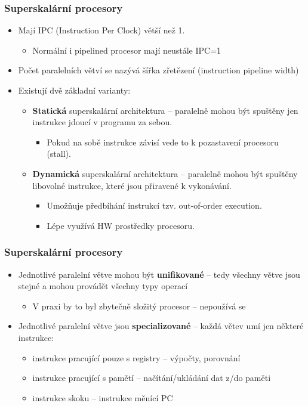 \documentclass{beamer}
\begin{document}
\begin{frame}
\frametitle{Superskalární procesory}

\begin{itemize}
\item Mají IPC (Instruction Per Clock) větší než 1. 
  \begin{itemize}
  \item Normální i pipelined procesor mají neustále IPC=1
  \end{itemize}
\item Počet paralelních větví se nazývá šířka zřetězení (instruction pipeline width)
\item Existují dvě základní varianty:
  \begin{itemize}
  \item \textbf{Statická} superskalární architektura -- paralelně mohou být spuštěny jen instrukce jdoucí v programu za sebou.
    \begin{itemize}
    \item Pokud na sobě instrukce závisí vede to k pozastavení procesoru (stall).
    \end{itemize}
  \item \textbf{Dynamická} superskalární architektura -- paralelně mohou být spuštěny libovolné instrukce, které jsou přiravené k vykonávání. 
    \begin{itemize}
    \item Umožňuje předbíhání instrukcí tzv. out-of-order execution.
    \item Lépe využívá HW prostředky procesoru.
    \end{itemize}
  \end{itemize}
\end{itemize}

\end{frame}

\begin{frame}
\frametitle{Superskalární procesory}

\begin{itemize}
\item Jednotlivé paralelní větve mohou být \textbf{unifikované} -- tedy všechny větve jsou stejné a mohou provádět všechny typy operací
  \begin{itemize}
  \item V praxi by to byl zbytečně složitý procesor -- nepoužívá se
  \end{itemize}
\item Jednotlivé paralelní větve jsou \textbf{specializované} -- každá větev umí jen některé instrukce:
  \begin{itemize}
  \item instrukce pracující pouze s registry -- výpočty, porovnání
  \item instrukce pracující s pamětí -- načítání/ukládání dat z/do paměti
  \item instrukce skoku -- instrukce měnící PC
  \end{itemize}
\end{itemize}
\end{frame}
\end{document}

